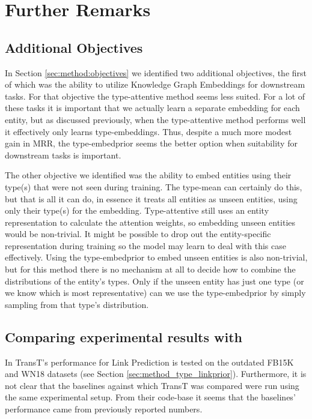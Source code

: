 \section*{Further Remarks}

\subsection{Additional Objectives}
In Section \ref{sec:method:objectives} we identified two additional objectives, the first of which was the ability to utilize Knowledge Graph Embeddings for downstream tasks. For that objective the type-attentive method seems less suited. For a lot of these tasks it is important that we actually learn a separate embedding for each entity, but as discussed previously, when the type-attentive method performs well it effectively only learns type-embeddings. 
Thus, despite a much more modest gain in MRR, the type-embedprior seems the better option when suitability for downstream tasks is important.

The other objective we identified was the ability to embed entities using their type(s) that were not seen during training. The type-mean can certainly do this, but that is all it can do, in essence it treats all entities as unseen entities, using only their type(s) for the embedding. Type-attentive still uses an entity representation to calculate the attention weights, so embedding unseen entities would be non-trivial. It might be possible to drop out the entity-specific representation during training so the model may learn to deal with this case effectively. 
Using the type-embedprior to embed unseen entities is also non-trivial, but for this method there is no mechanism at all to decide how to combine the distributions of the entity's types. Only if the unseen entity has just one type (or we know which is most representative) can we use the type-embedprior by simply sampling from that type's distribution.


\subsection{Comparing experimental results with }

In \cite{ma2017transt} TransT's performance for Link Prediction is tested on the outdated FB15K and WN18 datasets (see Section \ref{sec:method_type_linkprior}).
%
Furthermore, it is not clear that the baselines against which TransT was compared were run using the same experimental setup. From their code-base it seems that the baselines' performance came from previously reported numbers.


